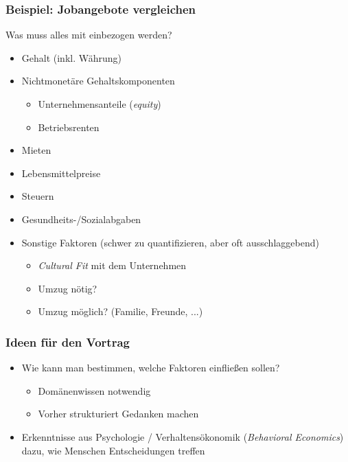 \documentclass{beamer}
\begin{document}
\begin{frame}
  \frametitle{Beispiel: Jobangebote vergleichen}
  Was muss alles mit einbezogen werden?
  \begin{itemize}
  \item Gehalt (inkl. W\"ahrung)
  \item Nichtmonet\"are Gehaltskomponenten
    \begin{itemize}
    \item Unternehmensanteile (\emph{equity})
    \item Betriebsrenten
    \end{itemize}
  \item Mieten
  \item Lebensmittelpreise
  \item Steuern
  \item Gesundheits-/Sozialabgaben
  \item Sonstige Faktoren (schwer zu quantifizieren, aber oft ausschlaggebend)
    \begin{itemize}
    \item \emph{Cultural Fit} mit dem Unternehmen
    \item Umzug n\"otig?
    \item Umzug m\"oglich? (Familie, Freunde, ...)
    \end{itemize}
  \end{itemize}
\end{frame}

\begin{frame}
  \frametitle{Ideen f\"ur den Vortrag}
  \begin{itemize}
  \item Wie kann man bestimmen, welche Faktoren einflie{\ss}en sollen?
    \begin{itemize}
    \item Dom\"anenwissen notwendig
    \item Vorher strukturiert Gedanken machen
    \end{itemize}
  \item Erkenntnisse aus Psychologie / Verhaltens\"okonomik (\emph{Behavioral Economics}) dazu, wie Menschen Entscheidungen treffen
  \end{itemize}
\end{frame}
\end{document}
